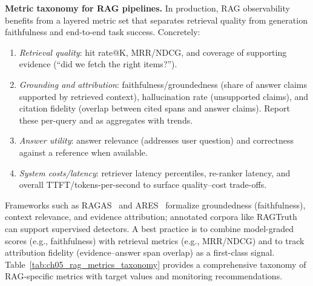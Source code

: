 \medskip
\noindent\textbf{Metric taxonomy for RAG pipelines.}
In production, RAG observability benefits from a layered metric set that separates retrieval quality from generation faithfulness and end-to-end task success. Concretely:
\begin{enumerate}
    \item \emph{Retrieval quality}: hit rate@K, MRR/NDCG, and coverage of supporting evidence (``did we fetch the right items?'').
    \item \emph{Grounding and attribution}: faithfulness/groundedness (share of answer claims supported by retrieved context), hallucination rate (unsupported claims), and citation fidelity (overlap between cited spans and answer claims). Report these per-query and as aggregates with trends.
    \item \emph{Answer utility}: answer relevance (addresses user question) and correctness against a reference when available.
    \item \emph{System costs/latency}: retriever latency percentiles, re-ranker latency, and overall TTFT/tokens-per-second to surface quality–cost trade-offs.
\end{enumerate}
Frameworks such as RAGAS~\cite{ragas_eacl2024} and ARES~\cite{ares_naacl2024} formalize groundedness (faithfulness), context relevance, and evidence attribution; annotated corpora like RAGTruth~\cite{ragtruth} can support supervised detectors. A best practice is to combine model-graded scores (e.g., faithfulness) with retrieval metrics (e.g., MRR/NDCG) and to track attribution fidelity (evidence–answer span overlap) as a first-class signal. Table~\ref{tab:ch05_rag_metrics_taxonomy} provides a comprehensive taxonomy of RAG-specific metrics with target values and monitoring recommendations.

